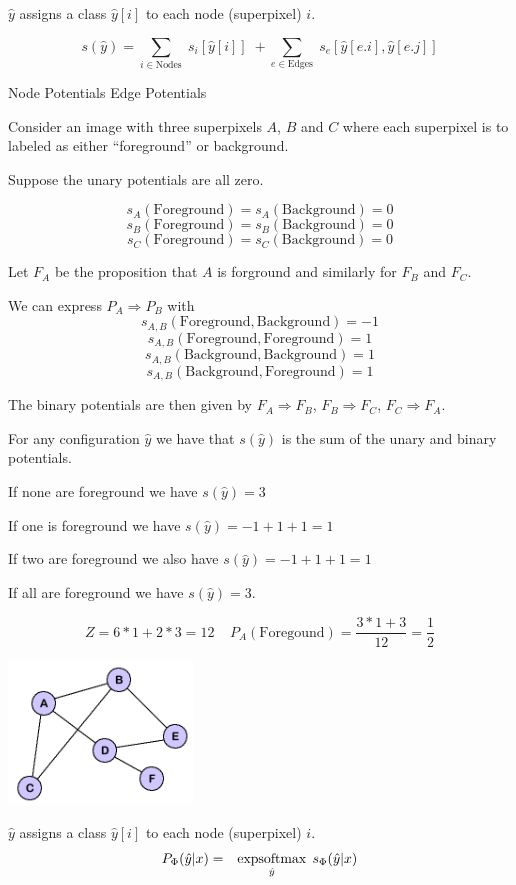{$\hat{y} $ assigns a class $\hat{y}[i]$ to each node (superpixel) $i$.


$$s(\hat{y}) = \sum_{i \in \mathrm{Nodes}}\; s_i[\hat{y}[i]]\; + \sum_{e \in \mathrm{Edges}}\;s_e[\hat{y}[e.i],\hat{y}[e.j]]$$

\vfill
\centerline{Node Potentials \hspace{4em}Edge Potentials}


Consider an image with three superpixels $A$, $B$ and $C$ where
each superpixel is to labeled as either ``foreground'' or background.

\vfill
Suppose the unary potentials are all zero.

\vfill
$$s_A(\mathrm{Foreground}) = s_A(\mathrm{Background}) = 0$$
$$s_B(\mathrm{Foreground}) = s_B(\mathrm{Background}) = 0$$
$$s_C(\mathrm{Foreground}) = s_C(\mathrm{Background}) = 0$$



\vfill
Let $F_A$ be the proposition that $A$ is forground and similarly for $F_B$ and $F_C$.

\vfill
We can express $P_A \Rightarrow P_B$ with
$$s_{A,B}(\mathrm{Foreground},\mathrm{Background}) = -1$$
$$s_{A,B}(\mathrm{Foreground},\mathrm{Foreground}) = 1$$
$$s_{A,B}(\mathrm{Background},\mathrm{Background}) = 1$$
$$s_{A,B}(\mathrm{Background},\mathrm{Foreground}) = 1$$

\vfill
The binary potentials are then given by
$F_A \Rightarrow F_B$, $F_B \Rightarrow F_C$, $F_C \Rightarrow F_A$.


For any configuration $\hat{y}$ we have that $s(\hat{y})$ is the sum of the unary and binary potentials.

\vfill
If none are foreground we have $s(\hat{y}) = 3$

\vfill
If one is foreground we have $s(\hat{y}) = -1 + 1+ 1 = 1$

\vfill
If two are foreground we also have $s(\hat{y}) = -1 + 1+ 1 = 1$

\vfill
If all are foreground we have $s(\hat{y}) = 3$.

\vfill
$$Z = 6*1 + 2*3 = 12\;\;\;\;P_A(\mathrm{Foregound}) = \frac{3*1 + 3}{12} = \frac{1}{2}$$

\bigskip
\centerline{\includegraphics[height= 1.5in]{../images/Graph}}
\medskip
$\hat{y} $ assigns a class $\hat{y}[i]$ to each node (superpixel) $i$.
\bigskip
\bigskip
{\color{red}
\begin{eqnarray*}
P_\Phi(\hat{y}|x) & = & \operatorname*{expsoftmax}_{\hat{y}}\;s_\Phi(\hat{y}|x)
\end{eqnarray*}
}

}
